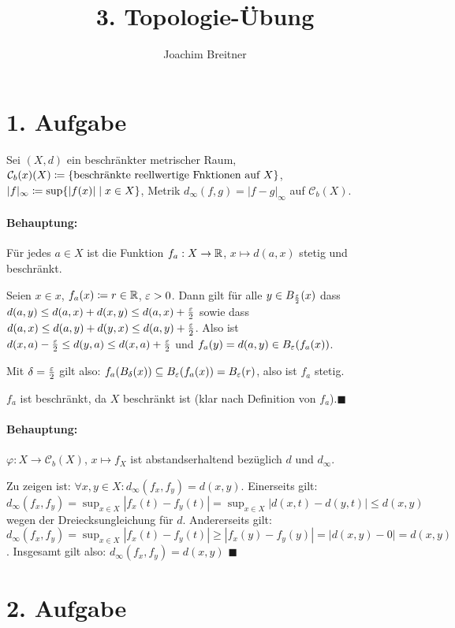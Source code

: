 \documentclass{article}
\title{3. Topologie-Übung}
\author{Joachim Breitner}
\begin{document}
\maketitle
\section*{1. Aufgabe}

Sei $(X, d)$ ein beschränkter metrischer Raum, $\mathcal C_b(x) (X) \da \{\text{beschränkte reellwertige Fnktionen auf $X$}\}$, $|f|_\infty \da \sup \{ |f(x)| \mid x \in X\}$, Metrik $d_\infty(f,g) = |f-g|_\infty$ auf $\mathcal C_b(X)$.

\paragraph{Behauptung:} Für jedes $a\in X$ ist die Funktion $f_a: X\to \mathbb{R}$, $x\mapsto d(a,x)$ stetig und beschränkt.

Seien $x\in x$, $f_a(x) \da r \in \MdR$, $\varepsilon > 0$. Dann gilt für alle $y\in B_{\frac{\varepsilon}2}(x)$ dass $d(a,y) \le d(a,x) + d(x,y) \le d(a,x) + \frac{\varepsilon}2$ sowie dass $d(a,x) \le d(a,y) + d(y,x) \le d(a,y) + \frac{\varepsilon}2$. Also ist $d(x,a)-\frac{\varepsilon}2 \le d(y,a) \le d(x,a) + \frac{\varepsilon}2$ und $f_a(y)= d(a,y) \in B_\varepsilon(f_a(x))$.

Mit $\delta = \frac{\varepsilon}2$ gilt also: $f_a(B_\delta(x)) \subseteq B_\varepsilon(f_a(x)) = B_\varepsilon(r)$, also ist $f_a$ stetig.

$f_a$ ist beschränkt, da $X$ beschränkt ist (klar nach Definition von $f_a$).\hfill$\blacksquare$

\paragraph{Behauptung:} $\varphi : X\to \mathcal C_b(X)$, $x\mapsto f_X$ ist abstandserhaltend bezüglich $d$ und $d_\infty$.

Zu zeigen ist: $\forall x,y\in X: d_\infty(f_x,f_y) = d(x,y)$. Einerseits gilt: $d_\infty(f_x,f_y) = \sup_{x\in X} | f_x(t) - f_y(t) | = \sup _{x\in X} |d(x,t) - d(y,t)| \le d(x,y)$ wegen der Dreiecksungleichung für $d$. Andererseits gilt: $d_\infty(f_x, f_y) = \sup_{x\in X} |f_x(t) - f_y(t)| \ge |f_x(y) - f_y(y)| = |d(x,y) - 0| = d(x,y)$. Insgesamt gilt also: $d_\infty(f_x,f_y) = d(x,y)$ \hfill$\blacksquare$

\section*{2. Aufgabe}
\end{document}
